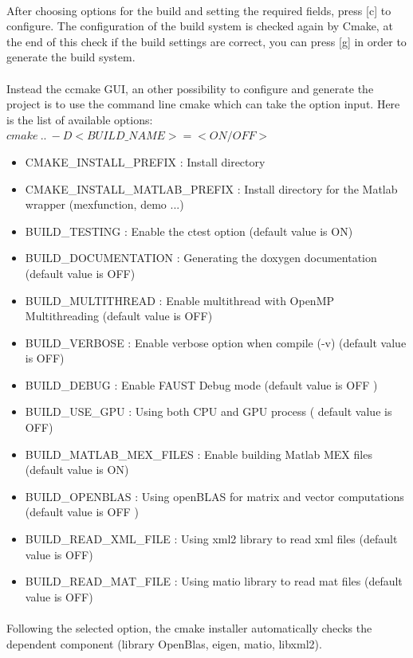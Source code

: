 \paragraph{}After choosing options for the build and setting the required fields, press [c] to configure. The configuration of the build system is checked again by Cmake, at the end of this check if the build settings are correct, you can press [g] in order to generate the build system.

\paragraph{} Instead the ccmake GUI, an other possibility to configure and generate the project is to use the command line cmake which can take the option input. Here is the list of available options: 
\texttt{$cmake\ ..\ -D<BUILD\_NAME>=<ON/OFF>$}

\begin{itemize}
\item CMAKE\_INSTALL\_PREFIX : Install directory
\item CMAKE\_INSTALL\_MATLAB\_PREFIX : Install directory for the Matlab wrapper (mexfunction, demo ...)
\item BUILD\_TESTING : Enable the ctest option (default value is ON)
\item BUILD\_DOCUMENTATION : Generating the doxygen documentation (default value is OFF)  
\item BUILD\_MULTITHREAD : Enable multithread with OpenMP Multithreading (default value is OFF)
\item BUILD\_VERBOSE : Enable verbose option when compile (-v) (default value is OFF)
\item BUILD\_DEBUG : Enable FAUST Debug mode (default value is OFF )
\item BUILD\_USE\_GPU : Using both CPU and GPU process ( default value is OFF)
\item BUILD\_MATLAB\_MEX\_FILES : Enable building Matlab MEX files (default value is ON)
\item BUILD\_OPENBLAS : Using openBLAS for matrix and vector computations (default value is OFF )
\item BUILD\_READ\_XML\_FILE : Using xml2 library to read xml files (default value is OFF)
\item BUILD\_READ\_MAT\_FILE : Using matio library to read mat files (default value is OFF)
\end{itemize}

\paragraph{}Following the selected option, the cmake installer automatically checks the dependent component (library OpenBlas, eigen, matio, libxml2).  

